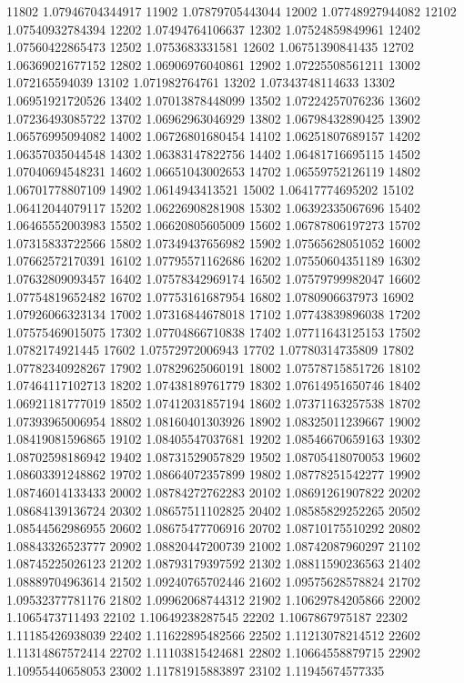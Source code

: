{11802 1.07946704344917
11902 1.07879705443044
12002 1.07748927944082
12102 1.07540932784394
12202 1.07494764106637
12302 1.07524859849961
12402 1.07560422865473
12502 1.0753683331581
12602 1.06751390841435
12702 1.06369021677152
12802 1.06906976040861
12902 1.07225508561211
13002 1.072165594039
13102 1.071982764761
13202 1.07343748114633
13302 1.06951921720526
13402 1.07013878448099
13502 1.07224257076236
13602 1.07236493085722
13702 1.06962963046929
13802 1.06798432890425
13902 1.06576995094082
14002 1.06726801680454
14102 1.06251807689157
14202 1.06357035044548
14302 1.06383147822756
14402 1.06481716695115
14502 1.07040694548231
14602 1.06651043002653
14702 1.06559752126119
14802 1.06701778807109
14902 1.0614943413521
15002 1.06417774695202
15102 1.06412044079117
15202 1.06226908281908
15302 1.06392335067696
15402 1.06465552003983
15502 1.06620805605009
15602 1.06787806197273
15702 1.07315833722566
15802 1.07349437656982
15902 1.07565628051052
16002 1.07662572170391
16102 1.07795571162686
16202 1.07550604351189
16302 1.07632809093457
16402 1.07578342969174
16502 1.07579799982047
16602 1.07754819652482
16702 1.07753161687954
16802 1.0780906637973
16902 1.07926066323134
17002 1.07316844678018
17102 1.07743839896038
17202 1.07575469015075
17302 1.07704866710838
17402 1.07711643125153
17502 1.0782174921445
17602 1.07572972006943
17702 1.07780314735809
17802 1.07782340928267
17902 1.07829625060191
18002 1.07578715851726
18102 1.07464117102713
18202 1.07438189761779
18302 1.07614951650746
18402 1.06921181777019
18502 1.07412031857194
18602 1.07371163257538
18702 1.07393965006954
18802 1.08160401303926
18902 1.08325011239667
19002 1.08419081596865
19102 1.08405547037681
19202 1.08546670659163
19302 1.08702598186942
19402 1.08731529057829
19502 1.08705418070053
19602 1.08603391248862
19702 1.08664072357899
19802 1.08778251542277
19902 1.08746014133433
20002 1.08784272762283
20102 1.08691261907822
20202 1.08684139136724
20302 1.08657511102825
20402 1.08585829252265
20502 1.08544562986955
20602 1.08675477706916
20702 1.08710175510292
20802 1.08843326523777
20902 1.08820447200739
21002 1.08742087960297
21102 1.08745225026123
21202 1.08793179397592
21302 1.08811590236563
21402 1.08889704963614
21502 1.09240765702446
21602 1.09575628578824
21702 1.09532377781176
21802 1.09962068744312
21902 1.10629784205866
22002 1.1065473711493
22102 1.10649238287545
22202 1.1067867975187
22302 1.11185426938039
22402 1.11622895482566
22502 1.11213078214512
22602 1.11314867572414
22702 1.11103815424681
22802 1.10664558879715
22902 1.10955440658053
23002 1.11781915883897
23102 1.11945674577335
}
